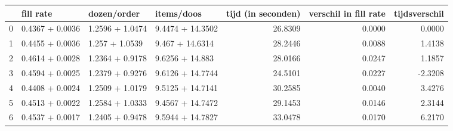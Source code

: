 \begin{tabular}{llllrrr}
\toprule
{} &        fill rate &      dozen/order &        items/doos &  tijd (in seconden) &  verschil in fill rate &  tijdsverschil \\
\midrule
0 &  0.4367 + 0.0036 &  1.2596 + 1.0474 &  9.4474 + 14.3502 &             26.8309 &                 0.0000 &         0.0000 \\
1 &  0.4455 + 0.0036 &   1.257 + 1.0539 &   9.467 + 14.6314 &             28.2446 &                 0.0088 &         1.4138 \\
2 &  0.4614 + 0.0028 &  1.2364 + 0.9178 &   9.6256 + 14.883 &             28.0166 &                 0.0247 &         1.1857 \\
3 &  0.4594 + 0.0025 &  1.2379 + 0.9276 &  9.6126 + 14.7744 &             24.5101 &                 0.0227 &        -2.3208 \\
4 &  0.4408 + 0.0024 &  1.2509 + 1.0179 &  9.5125 + 14.7141 &             30.2585 &                 0.0040 &         3.4276 \\
5 &  0.4513 + 0.0022 &  1.2584 + 1.0333 &  9.4567 + 14.7472 &             29.1453 &                 0.0146 &         2.3144 \\
6 &  0.4537 + 0.0017 &  1.2405 + 0.9478 &  9.5944 + 14.7827 &             33.0478 &                 0.0170 &         6.2170 \\
\bottomrule
\end{tabular}
